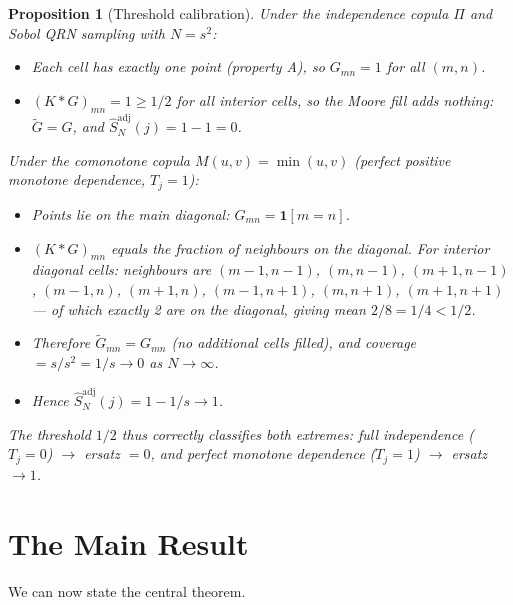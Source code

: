 \documentclass[11pt,a4paper]{article}
\newtheorem{proposition}[theorem]{Proposition}
\theoremstyle{definition}
\newcommand{\Ind}{\mathbf{1}}
\begin{document}
\begin{proposition}[Threshold calibration]
Under the independence copula $\Pi$ and Sobol QRN sampling with $N = s^2$:
\begin{itemize}
  \item Each cell has exactly one point (property A), so $G_{mn} = 1$
        for all $(m,n)$.
  \item $(K * G)_{mn} = 1 \ge 1/2$ for all interior cells, so the Moore
        fill adds nothing: $\tilde{G} = G$, and
        $\hat{S}^{\mathrm{adj}}_N(j) = 1 - 1 = 0$.
\end{itemize}
Under the comonotone copula $M(u,v) = \min(u,v)$ (perfect positive
monotone dependence, $T_j = 1$):
\begin{itemize}
  \item Points lie on the main diagonal: $G_{mn} = \Ind[m = n]$.
  \item $(K * G)_{mn}$ equals the fraction of neighbours on the diagonal.
        For interior diagonal cells: neighbours are $(m-1,n-1)$, $(m,n-1)$,
        $(m+1,n-1)$, $(m-1,n)$, $(m+1,n)$, $(m-1,n+1)$, $(m,n+1)$,
        $(m+1,n+1)$ — of which exactly 2 are on the diagonal, giving mean $2/8 = 1/4 < 1/2$.
  \item Therefore $\tilde{G}_{mn} = G_{mn}$ (no additional cells filled),
        and coverage $= s/s^2 = 1/s \to 0$ as $N \to \infty$.
  \item Hence $\hat{S}^{\mathrm{adj}}_N(j) = 1 - 1/s \to 1$.
\end{itemize}
The threshold $1/2$ thus correctly classifies both extremes:
full independence ($T_j = 0$) $\to$ ersatz $= 0$, and perfect
monotone dependence ($T_j = 1$) $\to$ ersatz $\to 1$.
\end{proposition}

\section{The Main Result}

We can now state the central theorem.
\end{document}
